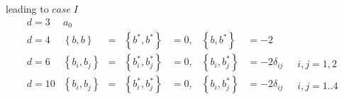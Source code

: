 \documentclass[a4paper,12pt]{book}
\begin{document}
\begin{itemize}
leading to $case\;I$%
\begin{equation}
\begin{array}{llllllll}
d=3 & a_{0} &  &  &  &  &  & 
\begin{array}{l}
\end{array}
\\ 
d=4 & \left\{ b,b\right\} & = & \left\{ b^{*},b^{*}\right\} & =0, & \left\{
b,b^{*}\right\} & =-2 & 
\begin{array}{l}
\end{array}
\\ 
d=6 & \left\{ b_{i},b_{j}\right\} & = & \left\{ b_{i}^{*},b_{j}^{*}\right\}
& =0, & \left\{ b_{i},b_{j}^{*}\right\} & =-2\delta _{ij} & 
\begin{array}{l}
\\ 
{\ i,j=1,2}
\end{array}
\\ 
d=10 & \left\{ b_{i},b_{j}\right\} & = & \left\{ b_{i}^{*},b_{j}^{*}\right\}
& =0, & \left\{ b_{i},b_{j}^{*}\right\} & =-2\delta _{ij} & 
\begin{array}{l}
\\ 
{\ i,j=1..4}
\end{array}
\end{array}
\end{equation}


\end{itemize}
\end{document}
